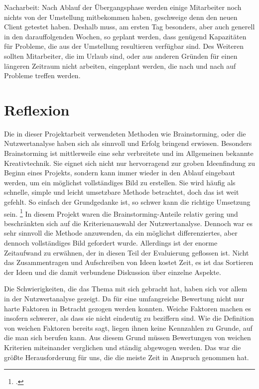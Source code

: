 \begin{description}
  \item Nacharbeit: Nach Ablauf der Übergangsphase werden einige Mitarbeiter noch nichts von der Umstellung mitbekommen haben, geschweige denn den neuen Client getestet haben. Deshalb muss, am ersten Tag besonders, aber auch generell in den darauffolgenden Wochen, so geplant werden, dass genügend Kapazitäten für Probleme, die aus der Umstellung resultieren verfügbar sind. Des Weiteren sollten Mitarbeiter, die im Urlaub sind, oder aus anderen Gründen für einen längeren Zeitraum nicht arbeiten, eingeplant werden, die nach und nach auf Probleme treffen werden.
\end{description}


\section{Reflexion} %
\label{sec:Reflexion}

Die in dieser Projektarbeit verwendeten Methoden wie Brainstorming, oder die Nutzwertanalyse haben sich als sinnvoll und Erfolg bringend erwiesen. Besonders Brainstorming ist mittlerweile eine sehr verbreitete und im Allgemeinen bekannte Kreativtechnik. Sie eignet sich nicht nur hervorragend zur groben Ideenfindung zu Beginn eines Projekts, sondern kann immer wieder in den Ablauf eingebaut werden, um ein möglichst vollständiges Bild zu erstellen. Sie wird häufig als schnelle, simple und leicht umsetzbare Methode betrachtet, doch das ist weit gefehlt. So einfach der Grundgedanke ist, so schwer kann die richtige Umsetzung sein. \footcite[Vgl. ][]{vanAerssen.2022} In diesem Projekt waren die Brainstorming-Anteile relativ gering und beschränkten sich auf die Kriterienauswahl der Nutzwertanalyse. Dennoch war es sehr sinnvoll die Methode anzuwenden, da ein möglichst differenziertes, aber dennoch vollständiges Bild gefordert wurde. Allerdings ist der enorme Zeitaufwand zu erwähnen, der in diesen Teil der Evaluierung geflossen ist. Nicht das Zusammentragen und Aufschreiben von Ideen kostet Zeit, es ist das Sortieren der Ideen und die damit verbundene Diskussion über einzelne Aspekte.

Die Schwierigkeiten, die das Thema mit sich gebracht hat, haben sich vor allem in der Nutzwertanalyse gezeigt. Da für eine umfangreiche Bewertung nicht nur harte Faktoren in Betracht gezogen werden konnten. Weiche Faktoren machen es insofern schwerer, als dass sie nicht eindeutig zu beziffern sind. Wie die Definition von weichen Faktoren bereits sagt, liegen ihnen keine Kennzahlen zu Grunde, auf die man sich berufen kann. Aus diesem Grund müssen Bewertungen von weichen Kriterien miteinander verglichen und ständig abgewogen werden. Das war die größte Herausforderung für uns, die die meiste Zeit in Anspruch genommen hat.

